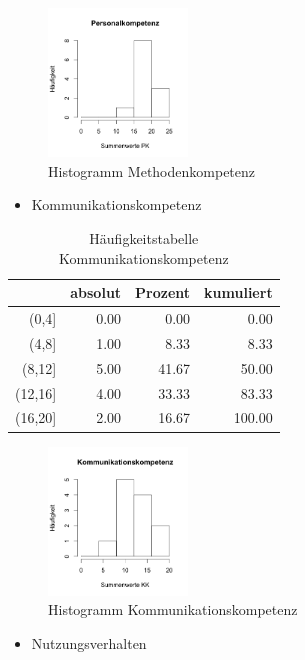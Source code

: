 \documentclass[12pt, bibliography=totoc]{scrartcl}
\begin{document}
\begin{figure}[H]
\centering
\caption{Histogramm Methodenkompetenz}
\includegraphics[width=0.33\textwidth]{Anhang/Persohist.png}
\end{figure}

\begin{itemize}
\tightlist
\item
  Kommunikationskompetenz
\end{itemize}

\begin{table}[H]
\centering
\caption{Häufigkeitstabelle Kommunikationskompetenz}
\begin{tabular}{rrrr}
  \hline
 & absolut & Prozent & kumuliert \\
  \hline
(0,4] & 0.00 & 0.00 & 0.00 \\
  (4,8] & 1.00 & 8.33 & 8.33 \\
  (8,12] & 5.00 & 41.67 & 50.00 \\
  (12,16] & 4.00 & 33.33 & 83.33 \\
  (16,20] & 2.00 & 16.67 & 100.00 \\
   \hline
\end{tabular}
\end{table}

\begin{figure}[H]
\centering
\caption{Histogramm Kommunikationskompetenz}
\includegraphics[width=0.33\textwidth]{Anhang/KKHist.png}
\end{figure}

\begin{itemize}
\tightlist
\item
  Nutzungsverhalten
\end{itemize}
\end{document}
